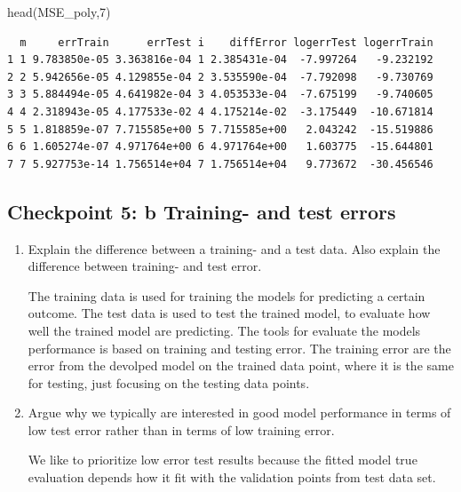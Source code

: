 \documentclass[
  letterpaper,
  DIV=11,
  numbers=noendperiod]{scrartcl}
\newenvironment{Shaded}{\begin{snugshade}}{\end{snugshade}}
\newcommand{\DecValTok}[1]{\textcolor[rgb]{0.68,0.00,0.00}{#1}}
\newcommand{\FunctionTok}[1]{\textcolor[rgb]{0.28,0.35,0.67}{#1}}
\newcommand{\NormalTok}[1]{\textcolor[rgb]{0.00,0.23,0.31}{#1}}
\begin{document}
\begin{Shaded}
\begin{Highlighting}[]
\FunctionTok{head}\NormalTok{(MSE\_poly,}\DecValTok{7}\NormalTok{)}
\end{Highlighting}
\end{Shaded}

\begin{verbatim}
  m     errTrain      errTest i    diffError logerrTest logerrTrain
1 1 9.783850e-05 3.363816e-04 1 2.385431e-04  -7.997264   -9.232192
2 2 5.942656e-05 4.129855e-04 2 3.535590e-04  -7.792098   -9.730769
3 3 5.884494e-05 4.641982e-04 3 4.053533e-04  -7.675199   -9.740605
4 4 2.318943e-05 4.177533e-02 4 4.175214e-02  -3.175449  -10.671814
5 5 1.818859e-07 7.715585e+00 5 7.715585e+00   2.043242  -15.519886
6 6 1.605274e-07 4.971764e+00 6 4.971764e+00   1.603775  -15.644801
7 7 5.927753e-14 1.756514e+04 7 1.756514e+04   9.773672  -30.456546
\end{verbatim}

\hypertarget{checkpoint-5-b-training--and-test-errors}{%
\subsection{Checkpoint 5: b Training- and test
errors}\label{checkpoint-5-b-training--and-test-errors}}

\begin{enumerate}
\def\labelenumi{(\alph{enumi})}
\item
  Explain the difference between a training- and a test data. Also
  explain the difference between training- and test error.

  The training data is used for training the models for predicting a
  certain outcome. The test data is used to test the trained model, to
  evaluate how well the trained model are predicting. The tools for
  evaluate the models performance is based on training and testing
  error. The training error are the error from the devolped model on the
  trained data point, where it is the same for testing, just focusing on
  the testing data points.
\item
  Argue why we typically are interested in good model performance in
  terms of low test error rather than in terms of low training error.

  We like to prioritize low error test results because the fitted model
  true evaluation depends how it fit with the validation points from
  test data set.
\end{enumerate}
\end{document}
